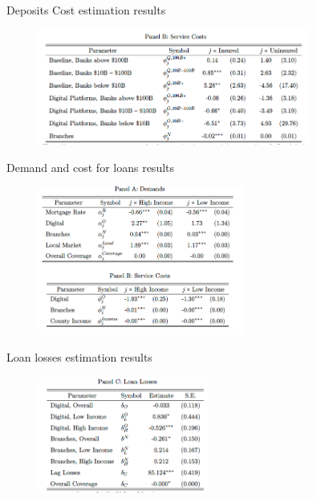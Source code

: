 \documentclass[notes,10pt, aspectratio=169]{beamer}
\begin{document}
    \begin{frame}{Deposits Cost estimation results}\label{cost_results}


        \begin{figure}
            \centering
            \includegraphics[width=0.8\textwidth]{imgs/tab9b.png}
        \end{figure}
        
        \end{frame}
    
        \begin{frame}{Demand and cost for loans results}\label{demand_cost_loans}


            \begin{figure}
                \centering
                \includegraphics[width=0.6\textwidth]{imgs/tab10.png}
            \end{figure}
            
            \end{frame}


        \begin{frame}{Loan losses estimation results}\label{loan_losses}

            \begin{figure}
                \centering
                \includegraphics[width=0.5\textwidth]{imgs/tab10c.png}
            \end{figure}
            
            \end{frame}
\end{document}
